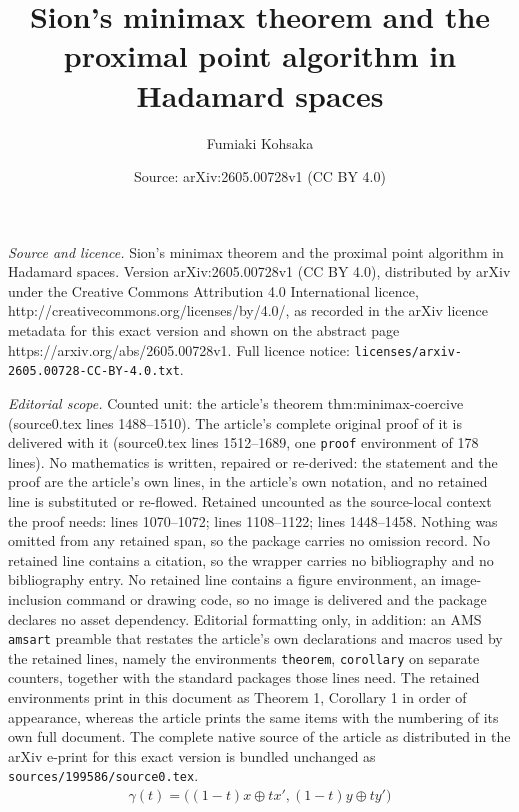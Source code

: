\documentclass[10pt,a4paper]{amsart}
\title{Sion's minimax theorem and the proximal point algorithm in Hadamard spaces}
\author{Fumiaki Kohsaka}
\date{Source: arXiv:2605.00728v1 (CC BY 4.0)}
\begin{document}
\maketitle

\noindent\emph{Source and licence.} Sion's minimax theorem and the proximal point algorithm in Hadamard spaces. Version arXiv:2605.00728v1 (CC BY 4.0), distributed by arXiv under the Creative Commons Attribution 4.0 International licence, http://creativecommons.org/licenses/by/4.0/, as recorded in the arXiv licence metadata for this exact version and shown on the abstract page https://arxiv.org/abs/2605.00728v1. Full licence notice: \texttt{licenses/arxiv-2605.00728-CC-BY-4.0.txt}.\par\smallskip

\noindent\textit{Editorial scope.} Counted unit: the article's theorem thm:minimax-coercive (source0.tex lines 1488--1510). The article's complete original proof of it is delivered with it (source0.tex lines 1512--1689, one \texttt{proof} environment of 178 lines). No mathematics is written, repaired or re-derived: the statement and the proof are the article's own lines, in the article's own notation, and no retained line is substituted or re-flowed.  Retained uncounted as the source-local context the proof needs: lines 1070--1072; lines 1108--1122; lines 1448--1458.  Nothing was omitted from any retained span, so the package carries no omission record.  No retained line contains a citation, so the wrapper carries no bibliography and no bibliography entry.  No retained line contains a figure environment, an image-inclusion command or drawing code, so no image is delivered and the package declares no asset dependency.  Editorial formatting only, in addition: an AMS \texttt{amsart} preamble that restates the article's own declarations and macros used by the retained lines, namely the environments \texttt{theorem}, \texttt{corollary} on separate counters, together with the standard packages those lines need.  The retained environments print in this document as Theorem 1, Corollary 1 in order of appearance, whereas the article prints the same items with the numbering of its own full document.  The complete native source of the article as distributed in the arXiv e-print for this exact version is bundled unchanged as \texttt{sources/199586/source0.tex}.
\begin{align}\label{eq:geodesic-product}
 \gamma(t) = \bigl((1-t)x\oplus t x', (1-t)y \oplus t y'\bigr)
\end{align}
\end{document}
